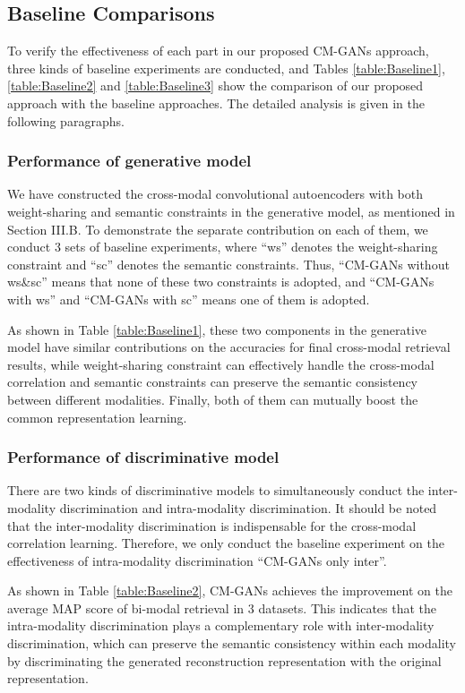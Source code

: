 \documentclass[journal]{IEEEtran}
\begin{document}
\subsection{Baseline Comparisons}

To verify the effectiveness of each part in our proposed CM-GANs approach, three kinds of baseline experiments are conducted, and Tables \ref{table:Baseline1}, \ref{table:Baseline2} and \ref{table:Baseline3} show the comparison of our proposed approach with the baseline approaches. The detailed analysis is given in the following paragraphs.

\subsubsection{Performance of generative model}

We have constructed the cross-modal convolutional autoencoders with both weight-sharing and semantic constraints in the generative model, as mentioned in Section III.B. To demonstrate the separate contribution on each of them, we conduct 3 sets of baseline experiments, where ``ws'' denotes the weight-sharing constraint and ``sc'' denotes the semantic constraints. Thus, ``CM-GANs without ws\&sc'' means that none of these two constraints is adopted, and ``CM-GANs with ws'' and ``CM-GANs with sc'' means one of them is adopted. 

As shown in Table \ref{table:Baseline1}, these two components in the generative model have similar contributions on the accuracies for final cross-modal retrieval results, while weight-sharing constraint can effectively handle the cross-modal correlation and semantic constraints can preserve the semantic consistency between different modalities. Finally, both of them can mutually boost the common representation learning.


\subsubsection{Performance of discriminative model}

There are two kinds of discriminative models to simultaneously conduct the inter-modality discrimination and intra-modality discrimination. It should be noted that the inter-modality discrimination is indispensable for the cross-modal correlation learning. Therefore, we only conduct the baseline experiment on the effectiveness of intra-modality discrimination ``CM-GANs only inter''. 

As shown in Table \ref{table:Baseline2}, CM-GANs achieves the improvement on the average MAP score of bi-modal retrieval in 3 datasets. This indicates that the intra-modality discrimination plays a complementary role with inter-modality discrimination, which can preserve the semantic consistency within each modality by discriminating the generated reconstruction representation with the original representation.
\end{document}
